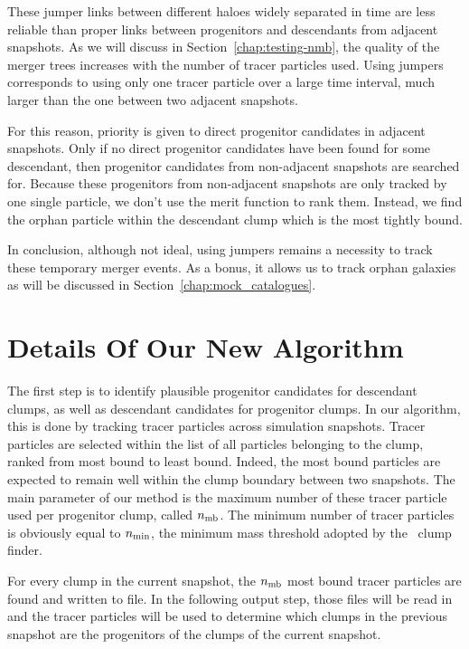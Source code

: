 These jumper links between different haloes widely separated in time
are less reliable than proper links between progenitors and
descendants from adjacent snapshots.  As we will discuss
in Section~\ref{chap:testing-nmb}, the quality of the merger trees
increases with the number of tracer particles used.  Using jumpers
corresponds to using only one tracer particle over a large time interval,
much larger than the one between two adjacent snapshots.

For this reason, priority is given to direct progenitor candidates in
adjacent snapshots.  Only if no direct progenitor candidates have been
found for some descendant, then progenitor candidates from
non-adjacent snapshots are searched for.  Because these progenitors
from non-adjacent snapshots are only tracked by one single particle,
we don't use the merit function to rank them.  Instead, we find the
orphan particle within the descendant clump which is the most tightly
bound.

In conclusion, although not ideal, using jumpers remains a necessity
to track these temporary merger events.  As a bonus, it allows us to
track orphan galaxies as will be discussed in
Section~\ref{chap:mock_catalogues}.





\section{Details Of Our New Algorithm}

The first step is to identify plausible progenitor candidates for
descendant clumps, as well as descendant candidates for progenitor
clumps.  In our algorithm, this is done by tracking tracer particles
across simulation snapshots. Tracer particles are selected within the
list of all particles belonging to the clump, ranked from most bound
to least bound. Indeed, the most bound particles are expected to
remain well within the clump boundary between two snapshots.  The main
parameter of our method is the maximum number of these tracer particle
used per progenitor clump, called $n_{\rm mb}$.  The minimum number of
tracer particles is obviously equal to $n_{\rm min}$, the minimum mass
threshold adopted by the \phew\ clump finder.

For every clump in the current snapshot, the $n_{\rm mb}$
most bound tracer particles are found and written to file.  In the following
output step, those files will be read in and the tracer particles
will be used to determine which clumps in the previous snapshot are the progenitors
of the clumps of the current snapshot.
 
